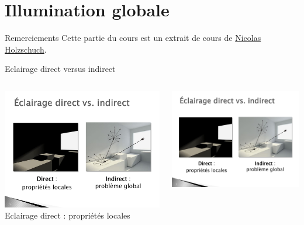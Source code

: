 \section{Illumination globale}

\begin{frame}{Remerciements}
    Cette partie du cours est un extrait de cours de \href{https://maverick.inria.fr/Members/Nicolas.Holzschuch/}{Nicolas Holzschuch}. 
\end{frame}

\begin{frame}{Eclairage direct versus indirect}
    \begin{columns}
        \begin{column}{0.49\textwidth}
            \begin{center}
                \includegraphics[width=\columnwidth]{figs/eclairage-direct.pdf}
                Eclairage direct : propriétés locales 
            \end{center}
        \end{column}
        \begin{column}{0.49\textwidth}
            \begin{center}
                \includegraphics[width=\columnwidth]{figs/eclairage-indirect.pdf}

\end{center}
\end{column}
\end{columns}
\end{frame}
